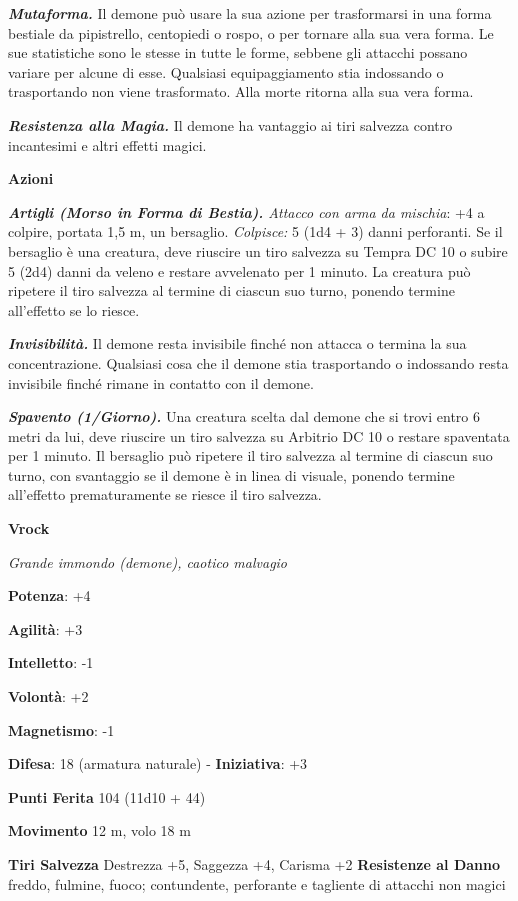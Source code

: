 \begin{multicols}{2}
\emph{\textbf{Mutaforma.}} Il demone può usare la sua azione per
trasformarsi in una forma bestiale da pipistrello, centopiedi o rospo, o
per tornare alla sua vera forma. Le sue statistiche sono le stesse in
tutte le forme, sebbene gli attacchi possano variare per alcune di esse.
Qualsiasi equipaggiamento stia indossando o trasportando non viene
trasformato. Alla morte ritorna alla sua vera forma.

\emph{\textbf{Resistenza alla Magia.}} Il demone ha vantaggio ai tiri
salvezza contro incantesimi e altri effetti magici.

\textbf{Azioni}

\emph{\textbf{Artigli (Morso in Forma di Bestia).} Attacco con arma da
mischia}: +4 a colpire, portata 1,5 m, un bersaglio. \emph{Colpisce:} 5
(1d4 + 3) danni perforanti. Se il bersaglio è una creatura, deve
riuscire un tiro salvezza su Tempra DC 10 o subire 5 (2d4) danni
da veleno e restare avvelenato per 1 minuto. La creatura può ripetere il
tiro salvezza al termine di ciascun suo turno, ponendo termine
all'effetto se lo riesce.

\emph{\textbf{Invisibilità.}} Il demone resta invisibile finché non
attacca o termina la sua concentrazione. Qualsiasi cosa che il demone
stia trasportando o indossando resta invisibile finché rimane in
contatto con il demone.

\emph{\textbf{Spavento (1/Giorno).}} Una creatura scelta dal demone che
si trovi entro 6 metri da lui, deve riuscire un tiro salvezza su Arbitrio DC 10 o restare spaventata per 1 minuto. Il bersaglio può
ripetere il tiro salvezza al termine di ciascun suo turno, con
svantaggio se il demone è in linea di visuale, ponendo termine
all'effetto prematuramente se riesce il tiro salvezza.


\textbf{Vrock}

\emph{Grande immondo (demone), caotico malvagio}

\textbf{Potenza}: +4

\textbf{Agilità}: +3

\textbf{Intelletto}: -1

\textbf{Volontà}: +2

\textbf{Magnetismo}: -1

\textbf{Difesa}: 18 (armatura naturale) - \textbf{Iniziativa}: +3

\textbf{Punti Ferita} 104 (11d10 + 44)

\textbf{Movimento} 12 m, volo 18 m

\textbf{Tiri Salvezza} Destrezza +5, Saggezza +4, Carisma +2
\textbf{Resistenze al Danno} freddo, fulmine, fuoco; contundente,
perforante e tagliente di attacchi non magici


\end{multicols}
